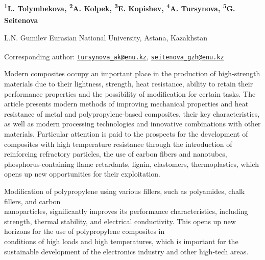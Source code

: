 
\begin{articleheader}

{\bfseries
\textsuperscript{1}L. Tolymbekova,
\textsuperscript{2}A. Kolpek,
\textsuperscript{3}E. Kopishev,
\textsuperscript{4}A. Tursynova\textsuperscript{\envelope },
\textsuperscript{5}G. Seitenova\textsuperscript{\envelope }
}
\end{articleheader}

\begin{affiliation}
L.N. Gumilev Eurasian National University, Astana, Kazakhstan

\raggedright \textsuperscript{\envelope }Corresponding author:
\href{mailto:tursynova_ak@enu.kz}{\nolinkurl{tursynova\_ak@enu.kz}},
\href{mailto:seitenova_gzh@enu.kz}{\nolinkurl{seitenova\_gzh@enu.kz}}
\end{affiliation}

Modern composites occupy an important place in the production of
high-strength materials due to their lightness, strength, heat
resistance, ability to retain their performance properties and the
possibility of modification for certain tasks. The article presents
modern methods of improving mechanical properties and heat resistance of
metal and polypropylene-based composites, their key characteristics, as
well as modern processing technologies and innovative combinations with
other materials. Particular attention is paid to the prospects for the
development of composites with high temperature resistance through the
introduction of reinforcing refractory particles, the use of carbon
fibers and nanotubes, phosphorus-containing flame retardants, lignin,
elastomers, thermoplastics, which opens up new opportunities for their
exploitation.

Modification of polypropylene using various fillers, such as polyamides,
chalk fillers, and carbon \\nanoparticles, significantly improves its
performance characteristics, including strength, thermal stability, and
electrical conductivity. This opens up new horizons for the use of
polypropylene composites in \\conditions of high loads and high
temperatures, which is important for the sustainable development of the
electronics industry and other high-tech areas.

